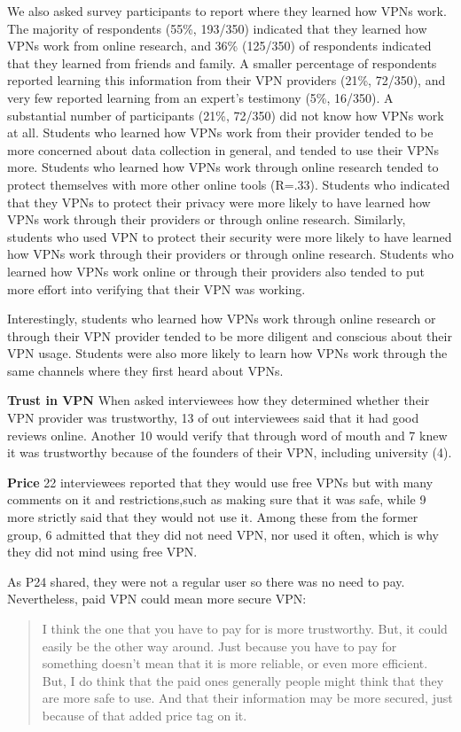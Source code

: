 We also asked survey participants to report where they learned how VPNs work. The majority of respondents (55\%, 193/350) indicated that they learned how VPNs work from online research, and 36\% (125/350) of respondents indicated that they learned from friends and family. A smaller percentage of respondents reported learning this information from their VPN providers (21\%, 72/350), and very few reported learning from an expert’s testimony (5\%, 16/350). A substantial number of participants (21\%, 72/350) did not know how VPNs work at all.
Students who learned how VPNs work from their provider tended to be more concerned about data collection in general, and tended to use their VPNs more. Students who learned how VPNs work through online research tended to protect themselves with more other online tools (R=.33). Students who indicated that they VPNs to protect their privacy were more likely to have learned how VPNs work through their providers or through online research. Similarly, students who used VPN to protect their security were more likely to have learned how VPNs work through their providers or through online research. Students who learned how VPNs work online or through their providers also tended to put more effort into verifying that their VPN was working.

Interestingly, students who learned how VPNs work through online research or through their VPN provider tended to be more diligent and conscious about their VPN usage. Students were also more likely to learn how VPNs work through the same channels where they first heard about VPNs.

\textbf{Trust in VPN}
When asked interviewees how they determined whether their VPN provider was trustworthy, 13 of out interviewees said that it had good reviews online. Another 10 would verify that through word of mouth and 7 knew it was trustworthy because of the founders of their VPN, including university (4). 

\textbf{Price}
22 interviewees reported that they would use free VPNs but with many comments on it and restrictions,such as making sure that it was safe, while 9 more strictly said that they would not use it. Among these from the former group, 6 admitted that they did not need VPN, nor used it often, which is why they did not mind using free VPN. 

As P24 shared, they were not a regular user so there was no need to pay. Nevertheless, paid VPN could mean more secure VPN:
\begin{quote} I think the one that you have to pay for is more trustworthy. But, it could easily be the other way around. Just because you have to pay for something doesn't mean that it is more reliable, or even more efficient. But, I do think that the paid ones generally people might think that they are more safe to use. And that their information may be more secured, just because of that added price tag on it.\end{quote}

